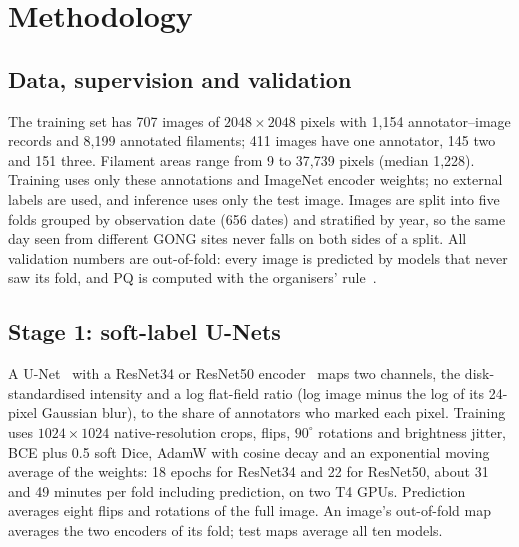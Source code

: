 \documentclass[sigconf]{acmart}
\begin{document}
\section{Methodology}\label{sec:methodology}
\subsection{Data, supervision and validation}
The training set has 707 images of $2048\times2048$ pixels with 1,154 annotator--image records and 8,199 annotated filaments; 411 images have one annotator, 145 two and 151 three. Filament areas range from 9 to 37,739 pixels (median 1,228). Training uses only these annotations and ImageNet encoder weights; no external labels are used, and inference uses only the test image. Images are split into five folds grouped by observation date (656 dates) and stratified by year, so the same day seen from different GONG sites never falls on both sides of a split. All validation numbers are out-of-fold: every image is predicted by models that never saw its fold, and PQ is computed with the organisers' rule~\cite{evaluation}.

\subsection{Stage 1: soft-label U-Nets}
A U-Net~\cite{ronneberger2015unet} with a ResNet34 or ResNet50 encoder~\cite{he2016resnet} maps two channels, the disk-standardised intensity and a log flat-field ratio (log image minus the log of its 24-pixel Gaussian blur), to the share of annotators who marked each pixel. Training uses $1024\times1024$ native-resolution crops, flips, $90^\circ$ rotations and brightness jitter, BCE plus 0.5 soft Dice, AdamW with cosine decay and an exponential moving average of the weights: 18 epochs for ResNet34 and 22 for ResNet50, about 31 and 49 minutes per fold including prediction, on two T4 GPUs. Prediction averages eight flips and rotations of the full image. An image's out-of-fold map averages the two encoders of its fold; test maps average all ten models.
\end{document}

